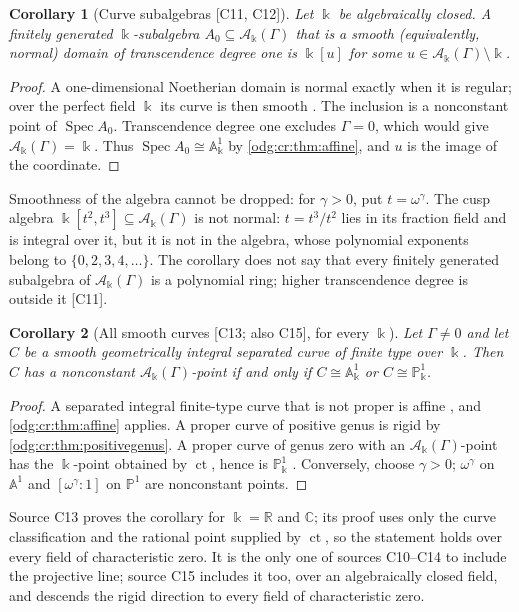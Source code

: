 \documentclass[11pt,oneside]{article}
\numberwithin{equation}{section}
\newtheorem{corollary}[corollary]{Corollary}
\theoremstyle{definition}
\theoremstyle{remark}
\newcommand{\R}{\mathbb R}
\newcommand{\C}{\mathbb C}
\newcommand{\ct}{\operatorname{ct}}
\newcommand{\src}[1]{\textup{\textsf{\small[#1]}}}
\newcommand{\crA}{\mathcal A_\Bbbk(\Gamma)}
\newcommand{\Aff}{\mathbb A}
\newcommand{\Spec}{\operatorname{Spec}}
\begin{document}
\begin{corollary}[Curve subalgebras \src{C11, C12}]\label{odg:cr:cor:subalgebra}
Let $\Bbbk$ be algebraically closed. A finitely generated $\Bbbk$-subalgebra
$A_0\subseteq\crA$ that is a smooth (equivalently, normal) domain of transcendence
degree one is $\Bbbk[u]$ for some $u\in\crA\setminus\Bbbk$.
\end{corollary}
\begin{proof}
A one-dimensional Noetherian domain is normal exactly when it is regular;
over the perfect field $\Bbbk$ its curve is then smooth
\cite{StacksCurveCompletion}. The inclusion is a nonconstant point of
$\Spec A_0$. Transcendence degree one excludes $\Gamma=0$, which would give
$\crA=\Bbbk$. Thus $\Spec A_0\cong\Aff^1_\Bbbk$ by
\cref{odg:cr:thm:affine}, and $u$ is the image of the coordinate.
\end{proof}

Smoothness of the algebra cannot be dropped: for $\gamma>0$, put $t=\omega^\gamma$.
The cusp algebra $\Bbbk[t^2,t^3]\subseteq\crA$ is not normal: $t=t^3/t^2$ lies
in its fraction field and is integral over it, but it is not in the algebra,
whose polynomial exponents belong to $\{0,2,3,4,\ldots\}$. The corollary does not say that every finitely
generated subalgebra of $\crA$ is a polynomial ring; higher transcendence degree is
outside it \src{C11}.

\begin{corollary}[All smooth curves \src{C13; also C15}, for every $\Bbbk$]\label{odg:cr:cor:allcurves}
Let $\Gamma\ne0$ and let $C$ be a smooth geometrically integral separated curve of
finite type over $\Bbbk$. Then $C$ has a nonconstant $\crA$-point if and only if
$C\cong\Aff^1_\Bbbk$ or $C\cong\mathbb P^1_\Bbbk$.
\end{corollary}
\begin{proof}
A separated integral finite-type curve that is not proper is affine
\cite{StacksCurveCompletion}, and
\cref{odg:cr:thm:affine} applies. A proper curve of positive genus is rigid by
\cref{odg:cr:thm:positivegenus}. A proper curve of genus zero with an $\crA$-point
has the $\Bbbk$-point obtained by $\ct$, hence is $\mathbb P^1_\Bbbk$
\cite{StacksGenusZero}. Conversely, choose $\gamma>0$; $\omega^\gamma$ on
$\Aff^1$ and $[\omega^\gamma:1]$ on $\mathbb P^1$ are nonconstant points.
\end{proof}

Source C13 proves the corollary for $\Bbbk=\R$ and $\C$; its proof uses only
the curve classification and the rational point supplied by $\ct$, so the
statement holds over every field of characteristic zero. It is the only one of sources
C10--C14 to include the projective line; source C15 includes it too, over an
algebraically closed field, and descends the rigid direction to every field of
characteristic zero.
\end{document}
